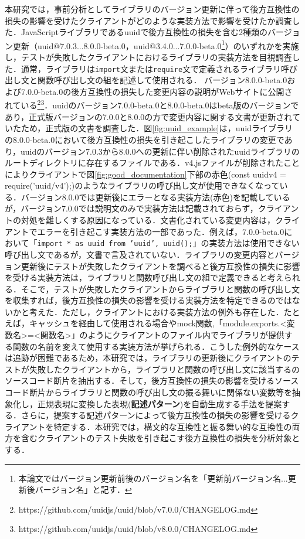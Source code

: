 \documentclass[11pt]{jreport}
\begin{document}
本研究では，事前分析としてライブラリのバージョン更新に伴って後方互換性の損失の影響を受けたクライアントがどのような実装方法で影響を受けたか調査した．JavaScriptライブラリであるuuidで後方互換性の損失を含む2種類のバージョン更新（uuid@7.0.3...8.0.0-beta.0，uuid@3.4.0...7.0.0-beta.0\footnote{本論文ではバージョン更新前後のバージョン名を「更新前バージョン名...更新後バージョン名」と記す．}）のいずれかを実施し，テストが失敗したクライアントにおけるライブラリの実装方法を目視調査した．通常，ライブラリは\texttt{import}文または\texttt{require}文で定義されるライブラリ呼び出し文と関数呼び出し文の組を記述して使用される．
バージョン8.0.0-beta.0および7.0.0-beta.0の後方互換性の損失した変更内容の説明がWebサイトに公開されている\footnote{https://github.com/uuidjs/uuid/blob/v7.0.0/CHANGELOG.md}\footnote{https://github.com/uuidjs/uuid/blob/v8.0.0/CHANGELOG.md}．uuidのバージョン7.0.0-beta.0と8.0.0-beta.0はbeta版のバージョンであり，正式版バージョンの7.0.0と8.0.0の方で変更内容に関する文書が更新されていたため，正式版の文書を調査した．図\ref{fig:uuid_example}は，uuidライブラリの8.0.0-beta.0において後方互換性の損失を引き起こしたライブラリの変更であり，uuidのバージョン7.0.3から8.0.0への更新に伴い削除されたuuidライブラリのルートディレクトリに存在するファイルである．v4.jsファイルが削除されたことによりクライアントで図\ref{fig:good_documentation}下部の赤色(const uuidv4 = require('uuid/v4');)のようなライブラリの呼び出し文が使用できなくなっている．バージョン8.0.0では更新後にエラーとなる実装方法(赤色)を記載しているが，バージョン7.0.0では説明文のみで実装方法は記載されておらず，クライアントの対処を難しくする原因になっている．文書化されている変更内容は，クライアントでエラーを引き起こす実装方法の一部であった．例えば，7.0.0-beta.0において「\texttt{import * as uuid from 'uuid', uuid();}」の実装方法は使用できない呼び出し文であるが，文書で言及されていない．ライブラリの変更内容とバージョン更新後にテストが失敗したクライアントを調べると後方互換性の損失に影響を受ける実装方法は，ライブラリと関数呼び出し文の組で定義できると考えられる．そこで，テストが失敗したクライアントからライブラリと関数の呼び出し文を収集すれば，後方互換性の損失の影響を受ける実装方法を特定できるのではないかと考えた．ただし，クライアントにおける実装方法の例外も存在した．たとえば，キャッシュを経由して使用される場合やmock関数,「module.exports.\textless{}変数名\textgreater{}=\textless{}関数名\textgreater{}」のようにクライアントのファイル内でライブラリが提供する関数の名前を変えて使用する実装方法が挙げられる．こうした例外的なケースは追跡が困難であるため，本研究では，ライブラリの更新後にクライアントのテストが失敗したクライアントから，ライブラリと関数の呼び出し文に該当するのソースコード断片を抽出する．そして，後方互換性の損失の影響を受けるソースコード断片からライブラリと関数の呼び出し文の振る舞いに関係ない変数等を抽象化し，正規表現に変換した表現(\textbf{記述パターン})を自動生成する手法を提案する．さらに，提案する記述パターンによって後方互換性の損失の影響を受けるクライアントを特定する．本研究では，構文的な互換性と振る舞い的な互換性の両方を含むクライアントのテスト失敗を引き起こす後方互換性の損失を分析対象とする．
\end{document}
